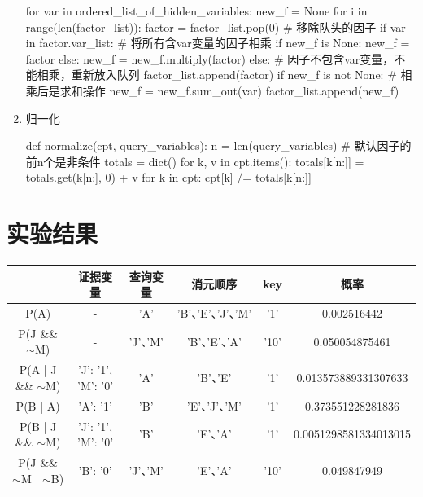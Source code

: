 \documentclass[10pt,letterpaper]{ctexart}
\begin{document}
\begin{enumerate}[itemindent=2em,label=\arabic*、]
  \begin{python}
for var in ordered_list_of_hidden_variables:
  new_f = None
  for i in range(len(factor_list)):
    factor = factor_list.pop(0)   # 移除队头的因子
    if var in factor.var_list:
      # 将所有含var变量的因子相乘
      if new_f is None:
        new_f = factor
      else:
        new_f = new_f.multiply(factor)
    else:   # 因子不包含var变量，不能相乘，重新放入队列
      factor_list.append(factor)
  if new_f is not None:   # 相乘后是求和操作
    new_f = new_f.sum_out(var)
    factor_list.append(new_f)
  \end{python}
  \item 归一化
  \begin{python}
def normalize(cpt, query_variables):
  n = len(query_variables)  # 默认因子的前n个是非条件
  totals = dict()
  for k, v in cpt.items():
    totals[k[n:]] = totals.get(k[n:], 0) + v
  for k in cpt:
    cpt[k] /= totals[k[n:]]
  \end{python}
\end{enumerate}

\section{实验结果}
\begin{table}[!htbp]
  \begin{tabular}{c|c|c|c|c|c}
    \toprule
      & 证据变量 & 查询变量 & 消元顺序 & key & 概率\\
    \hline
    P(A) & - & 'A' & 'B'、'E'、'J'、'M' & '1' & 0.002516442\\
    P(J \&\& $\sim$M) & - & 'J'、'M' & 'B'、'E'、'A' & '10' & 0.050054875461\\
    P(A | J \&\& $\sim$M) & 'J': '1', 'M': '0' & 'A' & 'B'、'E' & '1' & 0.013573889331307633\\
    P(B | A) & 'A': '1' & 'B' & 'E'、'J'、'M' & '1' & 0.373551228281836\\
    P(B | J \&\& $\sim$M) & 'J': '1', 'M': '0' & 'B' & 'E'、'A' & '1' & 0.0051298581334013015\\
    P(J \&\& $\sim$M | $\sim$B) & 'B': '0' & 'J'、'M' & 'E'、'A' & '10' & 0.049847949\\
    \bottomrule
  \end{tabular}
\end{table}
\end{document}
